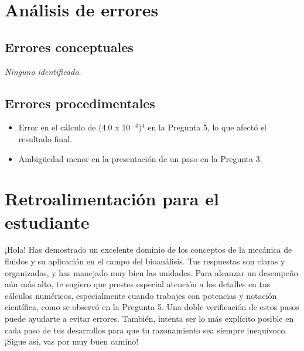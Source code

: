 \documentclass[11pt,a4paper]{article}
\begin{document}
\section*{Análisis de errores}

\subsection*{Errores conceptuales}
\textit{Ninguno identificado.}

\subsection*{Errores procedimentales}
\begin{itemize}[leftmargin=1.5em, itemsep=2pt]
  \item Error en el cálculo de (4.0 x 10$^{-}$$^{4}$)$^{4}$ en la Pregunta 5, lo que afectó el resultado final.
  \item Ambigüedad menor en la presentación de un paso en la Pregunta 3.
\end{itemize}

\section*{Retroalimentación para el estudiante}
\begin{tcolorbox}[cajaRecomendacion, title={Dirigido a: daliangelis inojosa 31516750}]
¡Hola! Has demostrado un excelente dominio de los conceptos de la mecánica de fluidos y su aplicación en el campo del bioanálisis. Tus respuestas son claras y organizadas, y has manejado muy bien las unidades. Para alcanzar un desempeño aún más alto, te sugiero que prestes especial atención a los detalles en tus cálculos numéricos, especialmente cuando trabajes con potencias y notación científica, como se observó en la Pregunta 5. Una doble verificación de estos pasos puede ayudarte a evitar errores. También, intenta ser lo más explícito posible en cada paso de tus desarrollos para que tu razonamiento sea siempre inequívoco. ¡Sigue así, vas por muy buen camino!
\end{tcolorbox}

\end{document}
